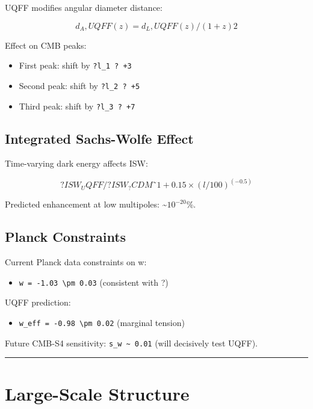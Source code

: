 \documentclass[12pt,a4paper]{article}
\begin{document}
UQFF modifies angular diameter distance:

\begin{equation}
d_A,UQFF(z) = d_L,UQFF(z)/(1+z)2
\end{equation}

Effect on CMB peaks:

\begin{itemize}
  \item First peak: shift by \texttt{?l\_1 ? +3}
  \item Second peak: shift by \texttt{?l\_2 ? +5}
  \item Third peak: shift by \texttt{?l\_3 ? +7}
\end{itemize}

\subsection{Integrated Sachs-Wolfe Effect}

Time-varying dark energy affects ISW:

\begin{equation}
?ISW_UQFF/?ISW_?CDM ˜ 1 + 0.15 \times (l/100)^(-0.5)
\end{equation}

Predicted enhancement at low multipoles: \textasciitilde{}$10^{-20}$\%.

\subsection{Planck Constraints}

Current Planck data constraints on w:

\begin{itemize}
  \item \texttt{w = -1.03 \textbackslash pm 0.03} (consistent with ?)
\end{itemize}

UQFF prediction:

\begin{itemize}
  \item \texttt{w\_eff = -0.98 \textbackslash pm 0.02} (marginal tension)
\end{itemize}

Future CMB-S4 sensitivity: \texttt{s\_w \textasciitilde{} 0.01} (will decisively test UQFF).

\medskip\hrule\medskip

\section{Large-Scale Structure}
\end{document}
